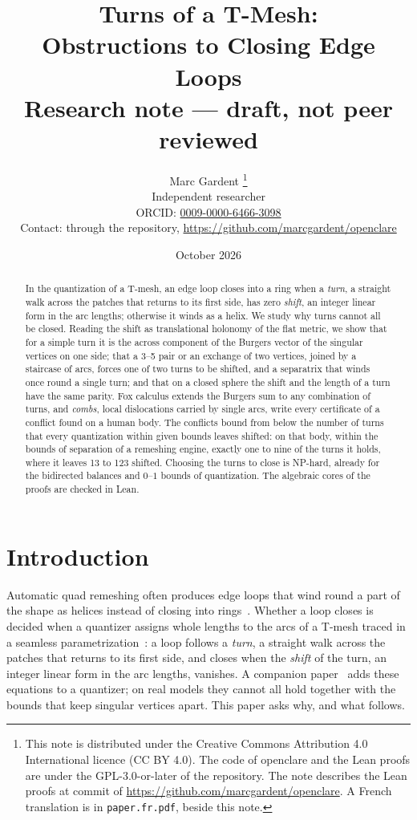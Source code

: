 \documentclass[11pt,a4paper]{article}
\title{Turns of a T-Mesh:\\
Obstructions to Closing Edge Loops\\[0.5em]
\large Research note --- draft, not peer reviewed}
\author{Marc Gardent%
\thanks{This note is distributed under the Creative Commons Attribution
4.0 International licence (CC BY 4.0). The code of openclare and the Lean
proofs are under the GPL-3.0-or-later of the repository. The note describes
the Lean proofs at commit \texttt{\enginecommit} of
\url{https://github.com/marcgardent/openclare}.
A French translation is in \texttt{paper.fr.pdf}, beside this note.}\\
\normalsize Independent researcher\\
\normalsize ORCID: \href{https://orcid.org/0009-0000-6466-3098}{0009-0000-6466-3098}\\
\normalsize Contact: through the repository,
\url{https://github.com/marcgardent/openclare}}
\date{October 2026}
\begin{document}
\maketitle

\begin{abstract}
In the quantization of a T-mesh, an edge loop closes into a ring when a
\emph{turn}, a straight walk across the patches that returns to its first
side, has zero \emph{shift}, an integer linear form in the arc lengths;
otherwise it winds as a helix. We study why turns cannot all be closed.
Reading the shift as translational holonomy of the flat metric, we show that
for a simple turn it is the across component of the Burgers vector of the
singular vertices on one side; that a 3--5 pair or an exchange of two
vertices, joined by a staircase of arcs, forces one of two turns to be
shifted, and a separatrix that winds once round a single turn; and that on a
closed sphere the shift and the length of a turn have the same parity. Fox calculus extends the Burgers sum to
any combination of turns, and \emph{combs}, local dislocations carried by
single arcs, write every certificate of a conflict found on a human body. The
conflicts bound from below the number of turns that every quantization within
given bounds leaves shifted: on that body, within the bounds of separation of
a remeshing engine, exactly one to nine of the turns it holds, where it leaves
13 to 123 shifted. Choosing the turns to close is NP-hard, already for the
bidirected balances and $0$--$1$ bounds of quantization. The algebraic cores
of the proofs are checked in Lean.
\end{abstract}

\section{Introduction}

Automatic quad remeshing often produces edge loops that wind round a part of
the shape as helices instead of closing into
rings~\cite{bommes2011structure}. Whether a loop closes is decided when a
quantizer assigns whole lengths to the arcs of a T-mesh traced in a seamless
parametrization~\cite{campen2015qgp,lyon2021constrained,heistermann2023bimdf}:
a loop follows a \emph{turn}, a straight walk across the patches that returns
to its first side, and closes when the \emph{shift} of the turn, an integer
linear form in the arc lengths, vanishes. A companion
paper~\cite{gardent2026loops} adds these equations to a quantizer; on real
models they cannot all hold together with the bounds that keep singular
vertices apart. This paper asks why, and what follows.
\end{document}
